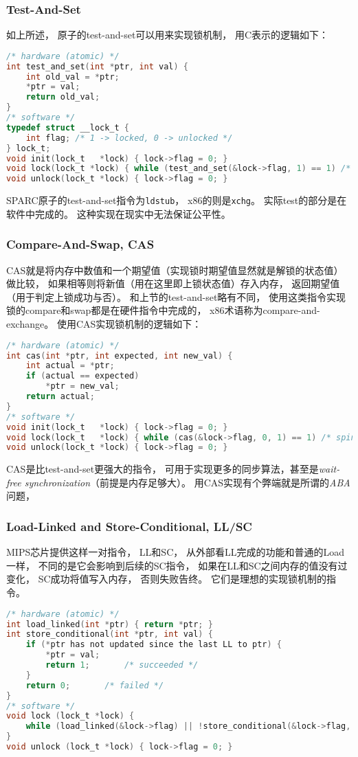 \subsubsection{Test-And-Set}
如上所述，
原子的test-and-set可以用来实现锁机制，
用C表示的逻辑如下：
\begin{lstlisting}[language=C]
/* hardware (atomic) */
int test_and_set(int *ptr, int val) {
	int old_val = *ptr;
	*ptr = val;
	return old_val;
}
/* software */
typedef struct __lock_t {
	int flag; /* 1 -> locked, 0 -> unlocked */
} lock_t;
void init(lock_t   *lock) { lock->flag = 0; }
void lock(lock_t *lock) { while (test_and_set(&lock->flag, 1) == 1) /* spin */ ; }
void unlock(lock_t *lock) { lock->flag = 0; }
  \end{lstlisting}
SPARC原子的test-and-set指令为\verb|ldstub|，
x86的则是\verb|xchg|。
实际test的部分是在软件中完成的。
这种实现在现实中无法保证公平性。

\subsubsection{Compare-And-Swap, CAS}
CAS就是将内存中数值和一个期望值（实现锁时期望值显然就是解锁的状态值）做比较，
如果相等则将新值（用在这里即上锁状态值）存入内存，
返回期望值（用于判定上锁成功与否）。
和上节的test-and-set略有不同，
使用这类指令实现锁的compare和swap都是在硬件指令中完成的，
x86术语称为compare-and-exchange。
使用CAS实现锁机制的逻辑如下：
\begin{lstlisting}[language=C]
/* hardware (atomic) */
int cas(int *ptr, int expected, int new_val) {
	int actual = *ptr;
	if (actual == expected)
		*ptr = new_val;
	return actual;
}
/* software */
void init(lock_t   *lock) { lock->flag = 0; }
void lock(lock_t   *lock) { while (cas(&lock->flag, 0, 1) == 1) /* spin */; }
void unlock(lock_t *lock) { lock->flag = 0; }
\end{lstlisting}
CAS是比test-and-set更强大的指令，
可用于实现更多的同步算法，甚至是{\em wait-free synchronization}（前提是内存足够大）。
用CAS实现有个弊端就是所谓的{\em ABA}问题，

\subsubsection{Load-Linked and Store-Conditional, LL/SC}
MIPS芯片提供这样一对指令，
LL和SC，
从外部看LL完成的功能和普通的Load一样，
不同的是它会影响到后续的SC指令，
如果在LL和SC之间内存的值没有过变化，
SC成功将值写入内存，
否则失败告终。
它们是理想的实现锁机制的指令。
\begin{lstlisting}[language=C]
/* hardware (atomic) */
int load_linked(int *ptr) { return *ptr; }
int store_conditional(int *ptr, int val) {
	if (*ptr has not updated since the last LL to ptr) {
		*ptr = val;
		return 1;		/* succeeded */
	}
	return 0;		/* failed */
}
/* software */
void lock (lock_t *lock) {
	while (load_linked(&lock->flag) || !store_conditional(&lock->flag, 1)) ;
}
void unlock (lock_t *lock) { lock->flag = 0; }
  \end{lstlisting}

